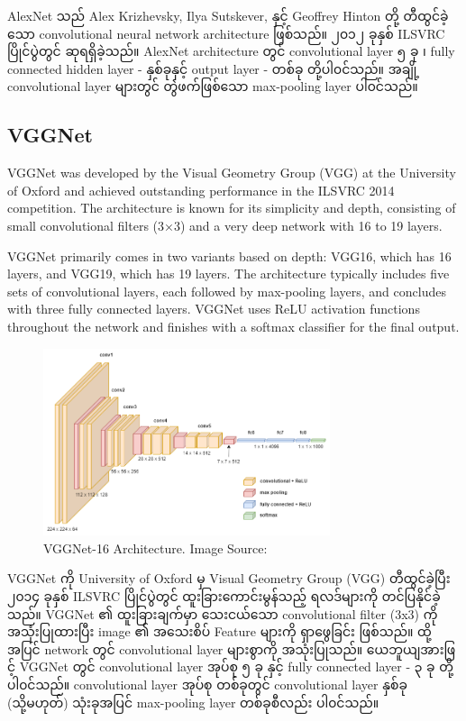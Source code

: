 AlexNet သည် Alex Krizhevsky, Ilya Sutskever, နှင့် Geoffrey Hinton တို့ တီထွင်ခဲ့သော convolutional neural network architecture ဖြစ်သည်။ ၂၀၁၂ ခုနှစ် ILSVRC ပြိုင်ပွဲတွင် ဆုရရှိခဲ့သည်။ AlexNet architecture တွင် convolutional layer ၅ ခု ၊ fully connected hidden layer - နှစ်ခုနှင့် output layer - တစ်ခု တို့ပါ၀င်သည်။ အချို့ convolutional layer များတွင် တွဲဖက်ဖြစ်သော max-pooling layer ပါ၀င်သည်။ 

\subsection{VGGNet}

VGGNet \cite{VGGNet2014}  was developed by the Visual Geometry Group (VGG) at the University of Oxford and achieved outstanding performance in the ILSVRC 2014 competition. The architecture is known for its simplicity and depth, consisting of small convolutional filters (3×3) and a very deep network with 16 to 19 layers.

VGGNet primarily comes in two variants based on depth: VGG16, which has 16 layers, and VGG19, which has 19 layers. The architecture typically includes five sets of convolutional layers, each followed by max-pooling layers, and concludes with three fully connected layers. VGGNet uses ReLU activation functions throughout the network and finishes with a softmax classifier for the final output.

\vspace{0.5em}
\begin{figure}[h]%
\centering 
\includegraphics[width=0.75\textwidth]{imgs/vgg16.png}
\caption{VGGNet-16 Architecture. Image Source: \cite{web:NNDiagrams}}\label{fig:vgg-16}
\end{figure}

VGGNet ကို University of Oxford မှ  Visual Geometry Group (VGG) တီထွင်ခဲ့ပြီး ၂၀၁၄ ခုနှစ် ILSVRC ပြိုင်ပွဲတွင် ထူးခြားကောင်းမွန်သည့် ရလဒ်များကို တင်ပြနိုင်ခဲ့သည်။ VGGNet ၏ ထူးခြားချက်မှာ သေးငယ်သော convolutional filter (3x3) ကို အသုံးပြုထားပြီး image ၏ အသေးစိပ် Feature များကို ရှာဖွေခြင်း ဖြစ်သည်။ ထို့အပြင် network တွင် convolutional layer များစွာကို အသုံးပြုသည်။ ယေဘူယျအားဖြင့် VGGNet တွင် convolutional layer အုပ်စု ၅ ခု နှင့် fully connected layer - ၃ ခု တို့ပါ၀င်သည်။  convolutional layer အုပ်စု တစ်ခုတွင် convolutional layer နှစ်ခု (သို့မဟုတ်) သုံးခုအပြင် max-pooling layer တစ်ခုစီလည်း ပါ၀င်သည်။ 

